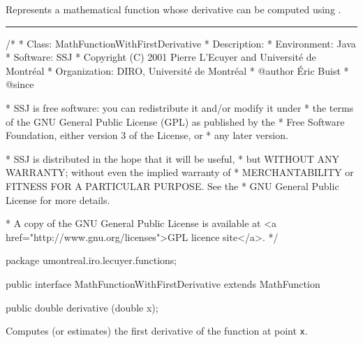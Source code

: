 
Represents a mathematical function whose
derivative can be computed using
.

\bigskip\hrule

\begin{code}
\begin{hide}
/*
 * Class:        MathFunctionWithFirstDerivative
 * Description:  
 * Environment:  Java
 * Software:     SSJ 
 * Copyright (C) 2001  Pierre L'Ecuyer and Université de Montréal
 * Organization: DIRO, Université de Montréal
 * @author       Éric Buist
 * @since

 * SSJ is free software: you can redistribute it and/or modify it under
 * the terms of the GNU General Public License (GPL) as published by the
 * Free Software Foundation, either version 3 of the License, or
 * any later version.

 * SSJ is distributed in the hope that it will be useful,
 * but WITHOUT ANY WARRANTY; without even the implied warranty of
 * MERCHANTABILITY or FITNESS FOR A PARTICULAR PURPOSE.  See the
 * GNU General Public License for more details.

 * A copy of the GNU General Public License is available at
   <a href="http://www.gnu.org/licenses">GPL licence site</a>.
 */
\end{hide}
package umontreal.iro.lecuyer.functions;\begin{hide}

\end{hide}

public interface MathFunctionWithFirstDerivative extends MathFunction\begin{hide} {
\end{hide}

   public double derivative (double x);\begin{hide}
}\end{hide}
\end{code}
\begin{tabb}   
   Computes (or estimates) the first derivative 
   of the function at point \texttt{x}.
\end{tabb}
\begin{htmlonly}
\end{htmlonly}

